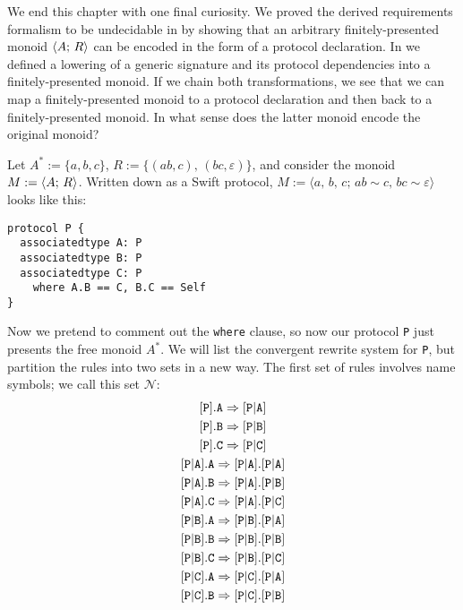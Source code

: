 \documentclass[../generics]{subfiles}
\begin{document}
\begin{example}\label{double encoding}
We end this chapter with one final curiosity. We proved the derived requirements formalism to be undecidable in  by showing that an arbitrary finitely-presented monoid $\langle A;\,R\rangle$ can be encoded in the form of a protocol declaration. In  we defined a lowering of a generic signature and its protocol dependencies into a finitely-presented monoid. If we chain both transformations, we see that we can map a finitely-presented monoid to a protocol declaration and then back to a finitely-presented monoid. In what sense does the latter monoid encode the original monoid?

Let $A^*:=\{a,b,c\}$, $R:=\{(ab,c),\,(bc,\varepsilon)\}$, and consider the monoid $M:=\langle A;\,R\rangle$. Written down as a Swift protocol, $M := \langle a,\,b,\,c;\,ab\sim c,\,bc\sim\varepsilon\rangle$ looks like this:
\begin{Verbatim}
protocol P {
  associatedtype A: P
  associatedtype B: P
  associatedtype C: P
    where A.B == C, B.C == Self
}
\end{Verbatim}
Now we pretend to comment out the \texttt{where} clause, so now our protocol \texttt{P} just presents the free monoid $A^*$. We will list the convergent rewrite system for \texttt{P}, but partition the rules into two sets in a new way. The first set of rules involves name symbols; we call this set $\mathcal{N}$:
\begin{gather*}
\AssocIntro{P}{A}\\
\AssocIntro{P}{B}\\
\AssocIntro{P}{C}\\
\assocsym{P}{A}.\texttt{A}\Rightarrow\assocsym{P}{A}.\assocsym{P}{A}\\
\assocsym{P}{A}.\texttt{B}\Rightarrow\assocsym{P}{A}.\assocsym{P}{B}\\
\assocsym{P}{A}.\texttt{C}\Rightarrow\assocsym{P}{A}.\assocsym{P}{C}\\
\assocsym{P}{B}.\texttt{A}\Rightarrow\assocsym{P}{B}.\assocsym{P}{A}\\
\assocsym{P}{B}.\texttt{B}\Rightarrow\assocsym{P}{B}.\assocsym{P}{B}\\
\assocsym{P}{B}.\texttt{C}\Rightarrow\assocsym{P}{B}.\assocsym{P}{C}\\
\assocsym{P}{C}.\texttt{A}\Rightarrow\assocsym{P}{C}.\assocsym{P}{A}\\
\assocsym{P}{C}.\texttt{B}\Rightarrow\assocsym{P}{C}.\assocsym{P}{B}\\

\end{gather*}
\end{example}
\end{document}
